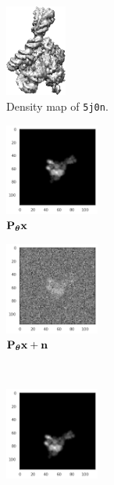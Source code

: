 \begin{figure}[ht!]
\begin{minipage}[b]{0.45\linewidth}
\begin{subfigure}[b]{0.45\linewidth}
            \centering
            \includegraphics[height=3cm]{figures/5j0n_5A_.png}
            \caption{Density map of \texttt{5j0n}.}
        \end{subfigure}
        \caption{%
            Two considered proteins.
        }\label{fig:pdb-proteins}
    \end{minipage}
    \hfill
    \begin{minipage}[b]{0.45\linewidth}
        \centering
        \begin{subfigure}[b]{0.49\linewidth}
            \centering
            \includegraphics[height=3cm]{figures/5j0n_noise0}
            \caption{$\mathbf{P}_{{\boldsymbol{\theta}}} \mathbf{x}$}
        \end{subfigure}
        \hfill
        \begin{subfigure}[b]{0.49\linewidth}
            \centering
            \includegraphics[height=3cm]{figures/5j0n_noise16}
            \caption{$\mathbf{P}_{{\boldsymbol{\theta}}} \mathbf{x} + \mathbf{n}$}
        \end{subfigure}
        \\ \vspace{0.5em}
        \begin{subfigure}[b]{0.49\linewidth}
            \centering
            \includegraphics[height=3cm]{figures/5j0n_translated}

\end{subfigure}
\end{minipage}
\end{figure}
